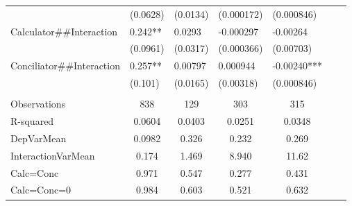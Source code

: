\begin{tabular}{rrrrrrr}
\multicolumn{1}{l}{} & \multicolumn{1}{l}{(0.0628)} & \multicolumn{1}{l}{(0.0134)} & \multicolumn{1}{l}{(0.000172)} & \multicolumn{1}{l}{(0.000846)} & \multicolumn{1}{l}{} & \multicolumn{1}{l}{} \\
\multicolumn{1}{l}{Calculator\#\#Interaction} & \multicolumn{1}{l}{0.242**} & \multicolumn{1}{l}{0.0293} & \multicolumn{1}{l}{-0.000297} & \multicolumn{1}{l}{-0.00264} & \multicolumn{1}{l}{} & \multicolumn{1}{l}{} \\
\multicolumn{1}{l}{} & \multicolumn{1}{l}{(0.0961)} & \multicolumn{1}{l}{(0.0317)} & \multicolumn{1}{l}{(0.000366)} & \multicolumn{1}{l}{(0.00703)} & \multicolumn{1}{l}{} & \multicolumn{1}{l}{} \\
\multicolumn{1}{l}{Conciliator\#\#Interaction} & \multicolumn{1}{l}{0.257**} & \multicolumn{1}{l}{0.00797} & \multicolumn{1}{l}{0.000944} & \multicolumn{1}{l}{-0.00240***} & \multicolumn{1}{l}{} & \multicolumn{1}{l}{} \\
\multicolumn{1}{l}{} & \multicolumn{1}{l}{(0.101)} & \multicolumn{1}{l}{(0.0165)} & \multicolumn{1}{l}{(0.00318)} & \multicolumn{1}{l}{(0.000846)} & \multicolumn{1}{l}{} & \multicolumn{1}{l}{} \\
\multicolumn{1}{l}{} & \multicolumn{1}{l}{} & \multicolumn{1}{l}{} & \multicolumn{1}{l}{} & \multicolumn{1}{l}{} & \multicolumn{1}{l}{} &  \\
\midrule
\multicolumn{1}{l}{Observations} & \multicolumn{1}{c}{838} & \multicolumn{1}{c}{129} & \multicolumn{1}{c}{303} & \multicolumn{1}{c}{315} & \multicolumn{1}{c}{} & \multicolumn{1}{c}{} \\
\multicolumn{1}{l}{R-squared} & \multicolumn{1}{c}{0.0604} & \multicolumn{1}{c}{0.0403} & \multicolumn{1}{c}{0.0251} & \multicolumn{1}{c}{0.0348} & \multicolumn{1}{c}{} & \multicolumn{1}{c}{} \\
\multicolumn{1}{l}{DepVarMean} & \multicolumn{1}{c}{0.0982} & \multicolumn{1}{c}{0.326} & \multicolumn{1}{c}{0.232} & \multicolumn{1}{c}{0.269} & \multicolumn{1}{c}{} & \multicolumn{1}{c}{} \\
\multicolumn{1}{l}{InteractionVarMean} & \multicolumn{1}{c}{0.174} & \multicolumn{1}{c}{1.469} & \multicolumn{1}{c}{8.940} & \multicolumn{1}{c}{11.62} & \multicolumn{1}{c}{} & \multicolumn{1}{c}{} \\
\multicolumn{1}{l}{Calc=Conc} & \multicolumn{1}{c}{0.971} & \multicolumn{1}{c}{0.547} & \multicolumn{1}{c}{0.277} & \multicolumn{1}{c}{0.431} & \multicolumn{1}{c}{} & \multicolumn{1}{c}{} \\
\multicolumn{1}{l}{Calc=Conc=0} & \multicolumn{1}{c}{0.984} & \multicolumn{1}{c}{0.603} & \multicolumn{1}{c}{0.521} & \multicolumn{1}{c}{0.632} & \multicolumn{1}{c}{} & \multicolumn{1}{c}{} \\
\bottomrule
\bottomrule
\end{tabular}%
